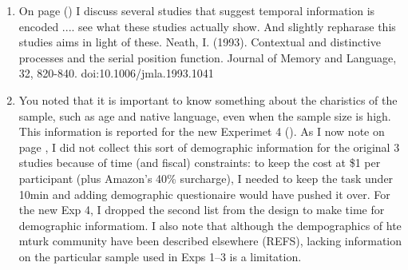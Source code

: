\documentclass[12pt]{article}
\begin{document}
\begin{enumerate}
\item
	On page (\pageref{TODO-8}) I discuss several studies that suggest temporal information is encoded .... see what these studies actually show. And slightly repharase this studies aims in light of these.
	Neath, I. (1993). Contextual and distinctive processes and the serial position function. Journal of Memory and Language, 32, 820-840. doi:10.1006/jmla.1993.1041

\item
	You noted that it is important to know something about the charistics of the sample, such as age and native language, even when the sample size is high. This information is reported for the new Experimet 4 (\pageref{TODO-9}). As I now note on page \pageref{TODO-10}, I did not collect this sort of demographic information for the original 3 studies because of time (and fiscal) constraints: to keep the cost at \$1 per participant (plus Amazon's 40\% surcharge), I needed to keep the task under 10min and adding demographic questionaire would have pushed it over. For the new Exp 4, I dropped the second list from the design to make time for demographic informatiom. I also note that although the dempographics of hte mturk community have been described elsewhere (REFS), lacking information on the particular sample used in Exps 1--3 is a limitation.


\end{enumerate}
\end{document}
